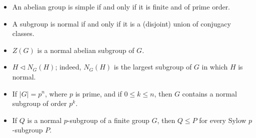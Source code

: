\documentclass[12pt]{report}
\theoremstyle{definition}
\begin{document}
\begin{itemize}
	\item An abelian group is simple if and only if it is finite and of prime order.
	\item A subgroup is normal if and only if it is a (disjoint) union of conjugacy classes.
	\item $Z(G)$ is a normal abelian subgroup of $G$.
	\item $H\vartriangleleft N_G(H)$; indeed, $N_G(H)$ is the largest subgroup of $G$ in which $H$ is normal.
	\item If $|G|=p^n$, where $p$ is prime, and if $0\le k\le n$, then $G$ contains a normal subgroup of order $p^k$.
	\item If $Q$ is a normal $p$-subgroup of a finite group $G$, then $Q\le P$ for every Sylow $p$-subgroup $P$.
\end{itemize}
\end{document}
